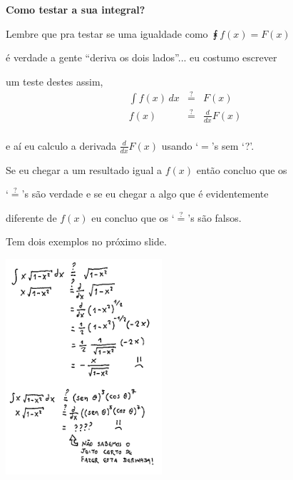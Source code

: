 \documentclass[oneside,12pt]{article}
\begin{document}
\newpage


{\bf Como testar a sua integral?}

\ssk

Lembre que pra testar se uma igualdade como $\intx{f(x)} = F(x)$

é verdade a gente ``deriva os dois lados''... eu costumo escrever

um teste destes assim,
%
\def\qeq{\overset{?}{=}}
%
$$\begin{array}{ccr}
  \displaystyle \int {f(x)} \, dx &\qeq& F(x) \\
                f(x)  &\qeq& \frac{d}{dx} F(x) \\
  \end{array}
$$

e aí eu calculo a derivada $\frac{d}{dx} F(x)$ usando `$=$'s sem `?'.

Se eu chegar a um resultado igual a $f(x)$ então concluo que os

`$\qeq$'s são verdade e se eu chegar a algo que é evidentemente

diferente de $f(x)$ eu concluo que os `$\qeq$'s são falsos.

\ssk

Tem dois exemplos no próximo slide.

\newpage


\includegraphics[height=8cm]{2020-1-C2/20201126_strig_teste.pdf}
\end{document}
